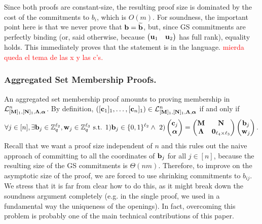 Since both proofs are constant-size, the resulting proof size is dominated by the cost of the commitments to $b_i$, which is $O(m)$. 
For soundness, the important point here is that we never prove that $\mathbf{b}=\widetilde{\mathbf{b}}$, but, since GS commitments are perfectly binding (or, said otherwise, because $\begin{pmatrix} \mathbf{u}_1 &   \mathbf{u}_2 \end{pmatrix}$
has full rank), equality holds. This immediately proves that the statement is in the language.  
\textcolor{red}{mierda queda el tema de las x y las c's. }
\subsubsection{Aggregated Set Membership Proofs.} An aggregated set membership proof amounts to proving membership in $\mathcal{L}_{[\mathbf{{M}}]_1,[\mathbf{{N}}]_1,\mathbf{{\Lambda}},{\boldsymbol \alpha}}^n$. By definition, $([\mathbf{c}_1]_1,\ldots, [\mathbf{c}_n]_1) \in\mathcal{L}_{[\mathbf{{M}}]_1,[\mathbf{{N}}]_1,\mathbf{{\Lambda}},{\boldsymbol \alpha}}^n$ if and only if 
\vspace{-0.2cm}
\begin{eqnarray*}
\forall j \in [n], \exists \mathbf{b}_j\in \mathbb{Z}_q^{\ell_2},\mathbf{w}_j\in\mathbb{Z}_q^{\ell_3} \text{ s.t. }
 1) \mathbf{b}_j\in \{0,1\}^{\ell_2}
  \wedge \ 2)
\left(\begin{matrix}
    \mathbf{c}_j\\
    {\boldsymbol \alpha}
\end{matrix}\right)
=
\begin{pmatrix}
    \mathbf{{M}}       & \mathbf{{N}}\\
    \mathbf{{\Lambda}} & \mathbf{{0}}_{{\ell_4}\times {\ell_3}}
\end{pmatrix}
\left(\begin{matrix}
    \mathbf{b}_j\\
    \mathbf{w}_j
\end{matrix}\right).
\end{eqnarray*}
Recall that we want a proof size independent of $n$ and this rules out the naive approach of committing to all the coordinates of $\mathbf{b}_j$  for all $j \in [n]$, because the resulting size of the GS commitments is $\Theta(nm)$. 
Therefore, to improve on the asymptotic size of the proof, we are forced to use shrinking commitments to $b_{ij}$. We stress that it is far from clear how to do this, as it might break down the soundness argument completely (e.g. in the single proof, we used in a fundamental way the uniqueness of the openings). In fact, overcoming this problem is probably one of the main technical contributions of this paper. 

